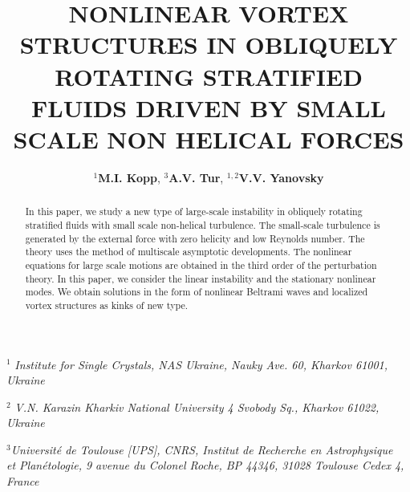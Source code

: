 \documentclass [12pt]{article}
\title{NONLINEAR VORTEX STRUCTURES IN OBLIQUELY ROTATING STRATIFIED
 FLUIDS   DRIVEN BY SMALL SCALE NON HELICAL FORCES}
\author{$^{1}$\textbf{M.I. Kopp}, $^3$\textbf{A.V. Tur}, $^{1,2}$\textbf{V.V. Yanovsky}}
\begin{document}
 \maketitle

$^{1}$ \textit{Institute for Single Crystals, NAS  Ukraine, Nauky Ave. 60, Kharkov 61001, Ukraine }

$^{2}$\textit{ V.N. Karazin Kharkiv National University 4 Svobody Sq., Kharkov 61022, Ukraine}

$^{3}$\textit{Universit\'{e} de Toulouse [UPS], CNRS, Institut de Recherche en Astrophysique \\et Plan\'{e}tologie,
9 avenue du Colonel Roche, BP 44346, 31028 Toulouse Cedex 4, France}

\bigskip




\begin{abstract}In this paper, we study a new type of large-scale instability in obliquely rotating stratified fluids with small scale non-helical turbulence. The small-scale turbulence is generated by the external force with zero helicity and low Reynolds number. The theory uses the method of multiscale asymptotic developments. The nonlinear equations for large scale motions are obtained in the third order of the perturbation theory. In this paper, we consider the linear instability and the stationary nonlinear modes. We obtain solutions in the form of nonlinear Beltrami waves and localized vortex structures as kinks of new type.
\end{abstract}
\end{document}
